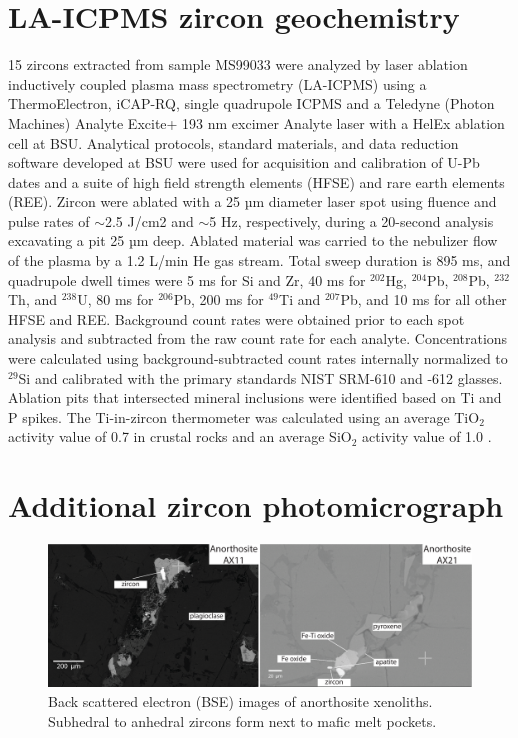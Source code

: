 \section*{LA-ICPMS zircon geochemistry}

15 zircons extracted from sample MS99033 were analyzed by laser ablation inductively coupled plasma mass spectrometry (LA-ICPMS) using a ThermoElectron, iCAP-RQ, single quadrupole ICPMS and a Teledyne (Photon Machines) Analyte Excite+ 193 nm excimer Analyte laser with a HelEx ablation cell at BSU. Analytical protocols, standard materials, and data reduction software developed at BSU were used for acquisition and calibration of U-Pb dates and a suite of high field strength elements (HFSE) and rare earth elements (REE). Zircon were ablated with a 25 µm diameter laser spot using fluence and pulse rates of $\sim$2.5 J/cm2 and $\sim$5 Hz, respectively, during a 20-second analysis excavating a pit 25 µm deep. Ablated material was carried to the nebulizer flow of the plasma by a 1.2 L/min He gas stream. Total sweep duration is 895 ms, and quadrupole dwell times were 5 ms for Si and Zr, 40 ms for $^{202}$Hg, $^{204}$Pb, $^{208}$Pb, $^{232}$Th, and $^{238}$U, 80 ms for $^{206}$Pb, 200 ms for $^{49}$Ti and $^{207}$Pb, and 10 ms for all other HFSE and REE. Background count rates were obtained prior to each spot analysis and subtracted from the raw count rate for each analyte. Concentrations were calculated using background-subtracted count rates internally normalized to $^{29}$Si and calibrated with the primary standards NIST SRM-610 and -612 glasses. Ablation pits that intersected mineral inclusions were identified based on Ti and P spikes. The Ti-in-zircon thermometer was calculated using an average TiO$_2$ activity value of 0.7 in crustal rocks \citep{Watson2006a} and an average SiO$_2$ activity value of 1.0 \citep{Ferry2007a}. 

\section*{Additional zircon photomicrograph}
\begin{figure}[h!]
\noindent\includegraphics[width=\textwidth]{figure/Zhang2021/SI_interstitial_zircons.pdf}
\caption{\footnotesize{Back scattered electron (BSE) images of anorthosite xenoliths. Subhedral to anhedral zircons form next to mafic melt pockets.}}
\label{fig:interstitial_zircons}
\end{figure}

